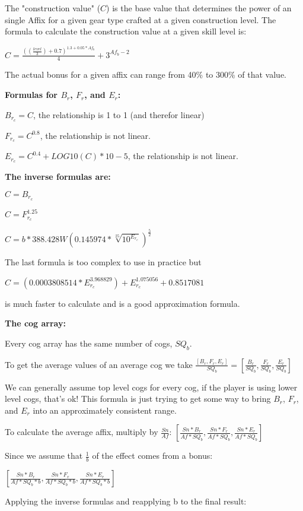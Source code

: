 \documentclass[12pt, letterpaper]{article}
\begin{document}
The "construction value" ($C$) is the base value that determines the power of an single Affix for a given gear type crafted at a given construction level. The formula to calculate the construction value at a given skill level is:

$C=\frac{\left(\left(\frac{level}{3}\right)+0.7\right)^{1.3+0.05*Af_b}}{4} + 3^{Af_b-2}$

The actual bonus for a given affix can range from 40\% to 300\% of that value.

\textbf{Formulas for $B_r$, $F_r$, and $E_r$:}

$B_{r_c} = C$, the relationship is 1 to 1 (and therefor linear)

$F_{r_c} = C^{0.8}$, the relationship is not linear.

$E_{r_c} = C^{0.4}+LOG10(C)*10-5$, the relationship is not linear.

\textbf{The inverse formulas are:}

$C = B_{r_c}$

$C = F_{r_c}^{1.25}$

$C = b*388.428W\left(0.145974*\sqrt[25]{10^{E_{r_c}}}\right)^{\frac{5}{2}}$

The last formula is too complex to use in practice but

$C = (0.0003808514*E_{r_c}^{3.968829})+E_{r_c}^{1.075056}+0.8517081$

is much faster to calculate and is a good approximation formula.

\textbf{The cog array:}

Every cog array has the same number of cogs, $SQ_b$.

To get the average values of an average cog we take  $\frac{[B_r,F_r,E_r]}{SQ_b}=\left[\frac{B_r}{SQ_b},\frac{F_r}{SQ_b},\frac{E_r}{SQ_b}\right]$

We can generally assume top level cogs for every cog, if the player is using lower level cogs, that's ok! This formula is just trying to get some way to bring $B_r$, $F_r$, and $E_r$ into an approximately consistent range.

To calculate the average affix, multiply by $\frac{Sn}{Af}$: $\left[\frac{Sn*B_r}{Af*SQ_b},\frac{Sn*F_r}{Af*SQ_b},\frac{Sn*E_r}{Af*SQ_b}\right]$

Since we assume that $\frac{1}{b}$ of the effect comes from a bonus:

$\left[\frac{Sn*B_r}{Af*SQ_b*b},\frac{Sn*F_r}{Af*SQ_b*b},\frac{Sn*E_r}{Af*SQ_b*b}\right]$

Applying the inverse formulas and reapplying b to the final result:
\end{document}
